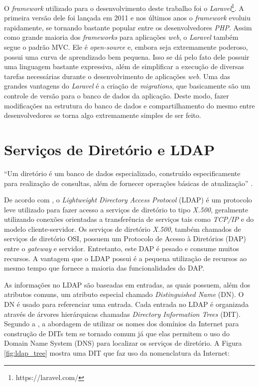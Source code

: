 \documentclass[
  12pt,       %
  openright,      %
  oneside,      %
  a4paper,      %
  english,      %
  french,        %
  spanish,     %
  brazil        %
  ]{abntex2-decsi}
\begin{document}
        O \textit{framework} utilizado para o desenvolvimento deste trabalho foi o \textit{Laravel}\footnote{https://laravel.com/}. A primeira versão dele foi lançada em 2011 e nos últimos anos o \textit{framework} evoluiu rapidamente, se tornando bastante popular entre os desenvolvedores \textit{PHP}. Assim como grande maioria dos \textit{frameworks} para aplicações \textit{web}, o \textit{Laravel} também segue o padrão MVC. Ele é \textit{open-source} e, embora seja extremamente poderoso, possui uma curva de aprendizado bem pequena. Isso se dá pelo fato dele possuir uma linguagem bastante expressiva, além de simplificar a execução de diversas tarefas necessárias durante o desenvolvimento de aplicações \textit{web}. Uma das grandes vantagens do \textit{Laravel} é a criação de \textit{migrations}, que basicamente são um controle de versão para o banco de dados da aplicação. Deste modo, fazer modificações na estrutura do banco de dados e compartilhamento do mesmo entre desenvolvedores se torna algo extremamente simples de ser feito. 

    \section{Serviços de Diretório e LDAP}

        ``Um diretório é um banco de dados especializado, construído especificamente para realização de consultas, além de fornecer operações básicas de atualização'' \cite[p. 3, tradução nossa]{openLdap:2011}.

        De acordo com , o \textit{Lightweight Directory Access Protocol} (LDAP) é um protocolo leve utilizado para fazer acesso a serviços de diretório to tipo \textit{X.500}, geralmente utilizando conexões orientadas a transferência de serviços tais como \textit{TCP/IP} e do modelo cliente-servidor. Os serviços de diretório \textit{X.500}, também chamados de serviços de diretório OSI, possuem um Protocolo de Acesso à Diretórios (DAP) entre o \textit{gateway} e servidor. Entretanto, este DAP é pesado e consume muitos recursos. A vantagem que o LDAP possui é a pequena utilização de recursos ao mesmo tempo que fornece a maioria das funcionalidades do DAP. 

        As informações no LDAP são baseadas em entradas, as quais possuem, além dos atributos comuns, um atributo especial chamado \textit{Distinguished Name} (DN). O DN é usado para referenciar uma entrada. Cada entrada no LDAP é organizada através de árvores hierárquicas chamadas \textit{Directory Information Trees} (DIT). Segundo a , a abordagem de utilizar os nomes dos domínios da Internet para construção de DITs tem se tornado comum já que elas permitem o uso do Domain Name System (DNS) para localizar os serviços de diretório. A Figura \ref{fig:ldap_tree} mostra uma DIT que faz uso da nomenclatura da Internet:
\end{document}
